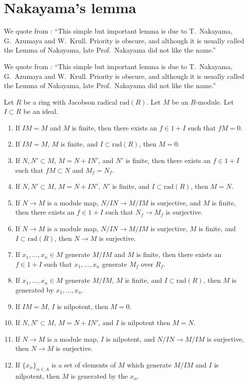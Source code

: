 \section{Nakayama's lemma}
\label{section-nakayama}

\noindent
We quote from \cite{MatCA}: ``This simple but
important lemma is due to T.~Nakayama, G.~Azumaya and W.~Krull. Priority
is obscure, and although it is usually called the Lemma of Nakayama, late
Prof.~Nakayama did not like the name.''

\begin{lemma}
\label{lemma-NAK}
\begin{reference}
\cite[1.M Lemma (NAK) page 11]{MatCA}
\end{reference}
\begin{history}
We quote from \cite{MatCA}: ``This simple but
important lemma is due to T.~Nakayama, G.~Azumaya and W.~Krull. Priority
is obscure, and although it is usually called the Lemma of Nakayama, late
Prof.~Nakayama did not like the name.''
\end{history}
Let $R$ be a ring with Jacobson radical $\text{rad}(R)$.
Let $M$ be an $R$-module. Let $I \subset R$
be an ideal.
\begin{enumerate}
\item
\label{item-nakayama}
If $IM = M$ and $M$ is finite, then there exists an $f \in 1 + I$ such that
$fM = 0$.
\item If $IM = M$, $M$ is finite, and $I \subset \text{rad}(R)$, then $M = 0$.
\item If $N, N' \subset M$, $M = N + IN'$, and $N'$ is finite,
then there exists an $f \in 1 + I$ such that $fM \subset N$ and $M_f = N_f$.
\item If $N, N' \subset M$, $M = N + IN'$, $N'$ is finite, and
$I \subset \text{rad}(R)$, then $M = N$.
\item If $N \to M$ is a module map, $N/IN \to M/IM$ is
surjective, and $M$ is finite, then there exists an $f \in 1 + I$
such that $N_f \to M_f$ is surjective.
\item If $N \to M$ is a module map, $N/IN \to M/IM$ is
surjective, $M$ is finite, and $I \subset \text{rad}(R)$,
then $N \to M$ is surjective.
\item If $x_1, \ldots, x_n \in M$ generate $M/IM$ and $M$ is finite,
then there exists an $f \in 1 + I$ such that $x_1, \ldots, x_n$
generate $M_f$ over $R_f$.
\item If $x_1, \ldots, x_n \in M$ generate $M/IM$, $M$ is finite, and
$I \subset \text{rad}(R)$, then $M$ is generated by $x_1, \ldots, x_n$.
\item If $IM = M$, $I$ is nilpotent, then $M = 0$.
\item If $N, N' \subset M$, $M = N + IN'$, and $I$ is nilpotent then $M = N$.
\item If $N \to M$ is a module map, $I$ is nilpotent, and $N/IN \to M/IM$
is surjective, then $N \to M$ is surjective.
\item If $\{x_\alpha\}_{\alpha \in A}$ is a set of elements of $M$
which generate $M/IM$ and $I$ is nilpotent, then $M$ is generated
by the $x_\alpha$.
\end{enumerate}
\end{lemma}


